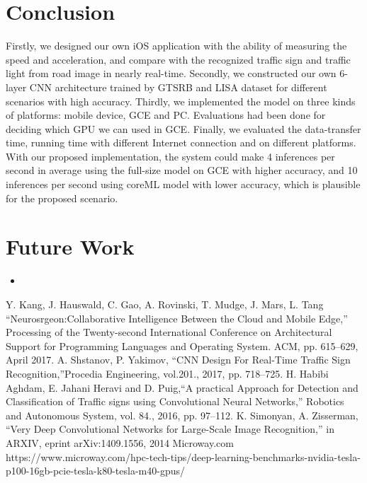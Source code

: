 \documentclass[conference]{IEEEtran}
\begin{document}
\section{Conclusion}
Firstly, we designed our own iOS application with the ability of measuring the speed and acceleration, and compare with the recognized traffic sign and traffic light from road image in nearly real-time. Secondly, we constructed our own 6-layer CNN architecture trained by GTSRB and LISA dataset for different scenarios with high accuracy. Thirdly, we implemented the model on three kinds of platforms: mobile device, GCE and PC. Evaluations had been done for deciding which GPU we can used in GCE. Finally, we evaluated the data-transfer time, running time with different Internet connection and on different platforms. With our proposed implementation, the system could make 4 inferences per second in average using the full-size model on GCE with higher accuracy, and 10 inferences per second using coreML model with lower accuracy, which is plausible for the proposed scenario.

\section{Future Work}

\begin{itemize}
    \item 
\end{itemize}


\begin{thebibliography}{00}
 Y. Kang, J. Hauswald, C. Gao, A. Rovinski, T. Mudge, J. Mars, L. Tang ``Neurosrgeon:Collaborative Intelligence Between the Cloud and Mobile Edge,'' Processing of the Twenty-second International Conference on Architectural Support for Programming Languages and Operating System. ACM, pp. 615--629, April 2017.
 A. Shstanov, P. Yakimov, ``CNN Design For Real-Time Traffic Sign Recognition,''Procedia Engineering, vol.201., 2017, pp. 718--725.
 H. Habibi Aghdam, E. Jahani Heravi and D. Puig,``A practical Approach for Detection and Classification of Traffic signs using Convolutional Neural Networks,'' Robotics and Autonomous System, vol. 84., 2016, pp. 97--112.
 K. Simonyan, A. Zisserman, ``Very Deep Convolutional Networks for Large-Scale Image Recognition,'' in ARXIV, eprint arXiv:1409.1556, 2014
 Microway.com https://www.microway.com/hpc-tech-tips/deep-learning-benchmarks-nvidia-tesla-p100-16gb-pcie-tesla-k80-tesla-m40-gpus/
\end{thebibliography}
\end{document}
